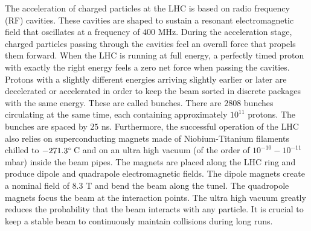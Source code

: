 The acceleration of charged particles at the LHC is based on radio frequency (RF) cavities. These cavities are shaped to sustain a resonant electromagnetic field that oscillates at a frequency of $400$ MHz. During the acceleration stage, charged particles passing through the cavities feel an overall force that propels them forward. When the LHC is running at full energy, a perfectly timed proton with exactly the right energy feels a zero net force when passing the cavities. Protons with a slightly different energies arriving slightly earlier or later are decelerated or accelerated in order to keep the beam sorted in discrete packages with the same energy. These are called bunches. There are $2808$ bunches circulating at the same time, each containing approximately $10^{11}$ protons. The bunches are spaced by $25$ ns. Furthermore, the successful operation of the LHC also relies on superconducting magnets made of Niobium-Titanium filaments chilled to $-271.3^\circ\,$C and on an ultra high vacuum (of the order of $10^{-10}-10^{-11}$ mbar) inside the beam pipes. The magnets are placed along the LHC ring and produce dipole and quadrapole electromagnetic fields. The dipole magnets create a nominal field of $8.3$ T and bend the beam along the tunel. The quadropole magnets focus the beam at the interaction points. The ultra high vacuum greatly reduces the probability that the beam interacts with any particle. It is crucial to keep a stable beam to continuously maintain collisions during long runs.

